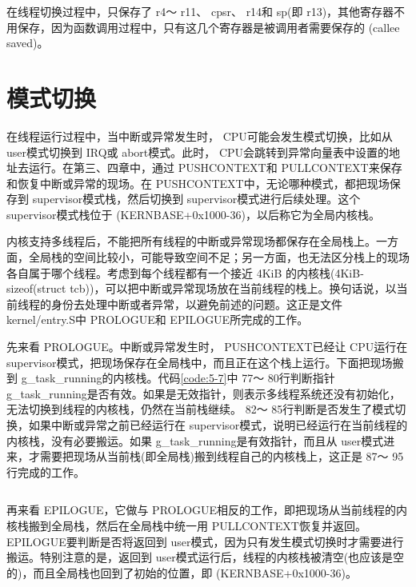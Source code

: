 \documentclass[main.tex]{subfiles}
\begin{document}
\begin{CJK*}{UTF8}{song}
\par
在线程切换过程中，只保存了 r4～ r11、 cpsr、 r14和 sp(即 r13)，其他寄存器不用保存，因为函数调用过程中，只有这几个寄存器是被调用者需要保存的 (callee saved)。

\section{模式切换}
在线程运行过程中，当中断或异常发生时， CPU可能会发生模式切换，比如从 user模式切换到 IRQ或 abort模式。此时， CPU会跳转到异常向量表中设置的地址去运行。在第三、四章中，通过 PUSH\-CONTEXT和  PULL\-CONTEXT来保存和恢复中断或异常的现场。在 PUSH\-CONTEXT中，无论哪种模式，都把现场保存到 supervisor模式栈，然后切换到 supervisor模式进行后续处理。这个 supervisor模式栈位于 (KERN\-BASE+0x1000-36)，以后称它为全局内核栈。

\par
内核支持多线程后，不能把所有线程的中断或异常现场都保存在全局栈上。一方面，全局栈的空间比较小，可能导致空间不足；另一方面，也无法区分栈上的现场各自属于哪个线程。考虑到每个线程都有一个接近 4\-KiB 的内核栈(4\-KiB-sizeof(struct tcb))，可以把中断或异常现场放在当前线程的栈上。换句话说，以当前线程的身份去处理中断或者异常，以避免前述的问题。这正是文件 kernel\-/\-entry.S中 PRO\-LOGUE和 EPI\-LOGUE所完成的工作。

\par
先来看 PRO\-LOGUE。中断或异常发生时， PUSH\-CONTEXT已经让 CPU运行在 supervisor模式，把现场保存在全局栈中，而且正在这个栈上运行。下面把现场搬到  g\_\-task\_\-running的内核栈。代码\ref{code:5-7}中 77～ 80行判断指针   g\_\-task\_\-running是否有效。如果是无效指针，则表示多线程系统还没有初始化，无法切换到线程的内核栈，仍然在当前栈继续。 82～ 85行判断是否发生了模式切换，如果中断或异常之前已经运行在 supervisor模式，说明已经运行在当前线程的内核栈，没有必要搬运。如果  g\_\-task\_\-running是有效指针，而且从 user模式进来，才需要把现场从当前栈(即全局栈)搬到线程自己的内核栈上，这正是 87～ 95行完成的工作。

\begin{code}
\label{code:5-7}
\inputminted[firstline=76,lastline=97,linenos,numbersep=5pt,frame=lines,framesep=2mm]{gas}{src/chapter05/kernel/entry.S}
\end{code}

\par
再来看 EPI\-LOGUE，它做与 PRO\-LOGUE相反的工作，即把现场从当前线程的内核栈搬到全局栈，然后在全局栈中统一用 PULL\-CONTEXT恢复并返回。 EPI\-LOGUE要判断是否将返回到 user模式，因为只有发生模式切换时才需要进行搬运。特别注意的是，返回到 user模式运行后，线程的内核栈被清空(也应该是空的)，而且全局栈也回到了初始的位置，即 (KERN\-BASE+0x1000-36)。


\end{CJK*}
\end{document}
